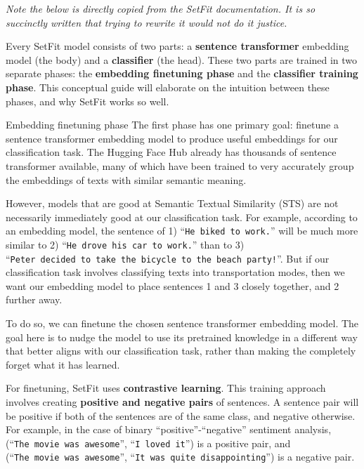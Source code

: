 \documentclass[
  letterpaper,
  DIV=11,
  numbers=noendperiod]{scrreprt}
\begin{document}
\begin{tcolorbox}[enhanced jigsaw, breakable, toprule=.15mm, titlerule=0mm, leftrule=.75mm, opacityback=0, opacitybacktitle=0.6, colbacktitle=quarto-callout-tip-color!10!white, colback=white, bottomrule=.15mm, title=\textcolor{quarto-callout-tip-color}{\faLightbulb}\hspace{0.5em}{How does it do this?}, coltitle=black, colframe=quarto-callout-tip-color-frame, bottomtitle=1mm, toptitle=1mm, arc=.35mm, rightrule=.15mm, left=2mm]

\emph{Note the below is directly copied from the SetFit documentation.
It is so succinctly written that trying to rewrite it would not do it
justice.}

Every SetFit model consists of two parts: a \textbf{sentence
transformer} embedding model (the body) and a \textbf{classifier} (the
head). These two parts are trained in two separate phases: the
\textbf{embedding finetuning phase} and the \textbf{classifier training
phase}. This conceptual guide will elaborate on the intuition between
these phases, and why SetFit works so well.

Embedding finetuning phase The first phase has one primary goal:
finetune a sentence transformer embedding model to produce useful
embeddings for our classification task. The Hugging Face Hub already has
thousands of sentence transformer available, many of which have been
trained to very accurately group the embeddings of texts with similar
semantic meaning.

However, models that are good at Semantic Textual Similarity (STS) are
not necessarily immediately good at our classification task. For
example, according to an embedding model, the sentence of 1)
``\texttt{He\ biked\ to\ work.}'' will be much more similar to 2)
``\texttt{He\ drove\ his\ car\ to\ work.}'' than to 3)
``\texttt{Peter\ decided\ to\ take\ the\ bicycle\ to\ the\ beach\ party!}''.
But if our classification task involves classifying texts into
transportation modes, then we want our embedding model to place
sentences 1 and 3 closely together, and 2 further away.

To do so, we can finetune the chosen sentence transformer embedding
model. The goal here is to nudge the model to use its pretrained
knowledge in a different way that better aligns with our classification
task, rather than making the completely forget what it has learned.

For finetuning, SetFit uses \textbf{contrastive learning}. This training
approach involves creating \textbf{positive and negative pairs} of
sentences. A sentence pair will be positive if both of the sentences are
of the same class, and negative otherwise. For example, in the case of
binary ``positive''-``negative'' sentiment analysis,
(``\texttt{The\ movie\ was\ awesome}'', ``\texttt{I\ loved\ it}'') is a
positive pair, and (``\texttt{The\ movie\ was\ awesome}'',
``\texttt{It\ was\ quite\ disappointing}'') is a negative pair.


\end{tcolorbox}
\end{document}
